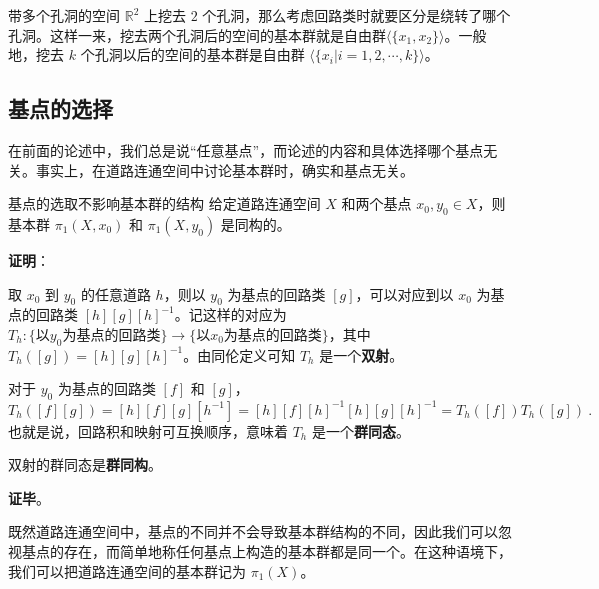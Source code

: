 \begin{example}{带多个孔洞的空间}
$\mathbb{R}^2$ 上挖去 $2$ 个孔洞，那么考虑回路类时就要区分是绕转了哪个孔洞。这样一来，挖去两个孔洞后的空间的基本群就是自由群$\langle\{x_1, x_2\}\rangle$。一般地，挖去 $k$ 个孔洞以后的空间的基本群是自由群 $\langle\{x_i|i=1, 2, \cdots, k\}\rangle$。
\end{example}

\subsection{基点的选择}

在前面的论述中，我们总是说“任意基点”，而论述的内容和具体选择哪个基点无关。事实上，在道路连通空间中讨论基本群时，确实和基点无关。

\begin{theorem}{基点的选取不影响基本群的结构}
给定道路连通空间 $X$ 和两个基点 $x_0, y_0\in X$，则基本群 $\pi_1(X, x_0)$ 和 $\pi_1(X, y_0)$ 是同构的。
\end{theorem}

\textbf{证明}：

取 $x_0$ 到 $y_0$ 的任意道路 $h$，则以 $y_0$ 为基点的回路类 $[g]$，可以对应到以 $x_0$ 为基点的回路类 $[h][g][h]^{-1}$。记这样的对应为 $T_h: \{\text{以} y_0 \text{为基点的回路类}\}\rightarrow\{\text{以} x_0 \text{为基点的回路类}\}$，其中 $T_h([g])=[h][g][h]^{-1}$。由同伦定义可知 $T_h$ 是一个\textbf{双射}。

对于 $y_0$ 为基点的回路类 $[f]$ 和 $[g]$，$$T_h([f][g])=[h][f][g][h^{-1}]=[h][f][h]^{-1}[h][g][h]^{-1}=T_h([f])T_h([g])~.$$
也就是说，回路积和映射可互换顺序，意味着 $T_h$ 是一个\textbf{群同态}。

双射的群同态是\textbf{群同构}。

\textbf{证毕}。

既然道路连通空间中，基点的不同并不会导致基本群结构的不同，因此我们可以忽视基点的存在，而简单地称任何基点上构造的基本群都是同一个。在这种语境下，我们可以把道路连通空间的基本群记为 $\pi_1(X)$。


